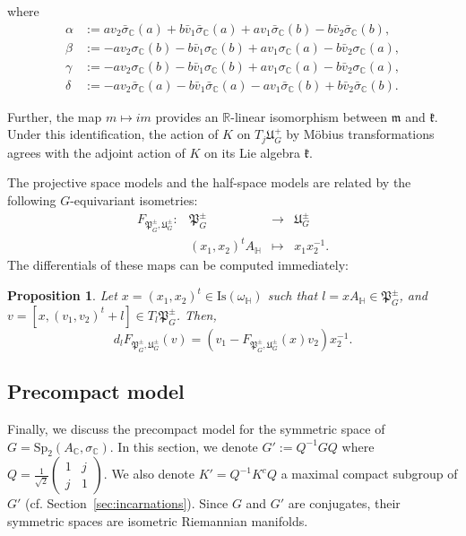 \documentclass[oneside,11pt]{amsart}
\newtheorem{prop}[thm]{Proposition}
\theoremstyle{definition}
\theoremstyle{remark}
\numberwithin{thm}{section}
\numberwithin{equation}{section}
\begin{document}
where
\begin{align*}
\alpha & := av_2\bar\sigma_{\mathbb C}(a)+b\bar v_1\bar\sigma_{\mathbb C}(a)+av_1\bar\sigma_{\mathbb C}(b)-b\bar v_2\bar\sigma_{\mathbb C}(b),\\
\beta & := -av_2\sigma_{\mathbb C}(b)-b\bar v_1\sigma_{\mathbb C}(b)+av_1\sigma_{\mathbb C}(a)-b\bar v_2\sigma_{\mathbb C}(a), \\
\gamma & := -av_2\sigma_{\mathbb C}(b)-b\bar v_1\sigma_{\mathbb C}(b)+av_1\sigma_{\mathbb C}(a)-b\bar v_2\sigma_{\mathbb C}(a),\\
\delta & := -av_2\bar\sigma_{\mathbb C}(a)-b\bar v_1\bar\sigma_{\mathbb C}(a)-av_1\bar\sigma_{\mathbb C}(b)+b\bar v_2\bar\sigma_{\mathbb C}(b).
\end{align*}

Further, the map $m\mapsto im$ provides an $\mathbb R$-linear isomorphism between $\mathfrak{m}$ and $\mathfrak k$. Under this identification, the action of $K$ on $T_j\mathfrak{U}_G^+$ by M\"obius transformations agrees with the adjoint action of $K$ on its Lie algebra $\mathfrak{k}$.

The projective space models and the half-space models are related by the following $G$-equivariant isometries: 
$$\begin{matrix}
F_{\mathfrak{P}_G^\pm,\mathfrak{U}_G^\pm} \colon & \mathfrak{P}_G^\pm & \to & \mathfrak{U}_G^\pm\\
 & (x_1,x_2)^tA_\mathbb H & \mapsto & x_1x_2^{-1}.
\end{matrix}$$
The differentials of these maps can be computed immediately:

\begin{prop}
    Let $x=(x_1,x_2)^t\in\mathrm{Is}(\omega_\mathbb H)$ such that $l=xA_\mathbb H\in\mathfrak{P}_G^\pm$, and $v=[x,(v_1,v_2)^t+l]\in T_{l}\mathfrak{P}_G^\pm$. Then, 
    $$d_{l}F_{\mathfrak{P}_G^\pm,\mathfrak{U}_G^\pm}(v)=(v_1-F_{\mathfrak{P}_G^\pm,\mathfrak{U}_G^\pm}(x) v_2)x_2^{-1}.$$ 
\end{prop}


\subsection{Precompact model}\label{sec:precompact_complex}

Finally, we discuss the precompact model for the symmetric space of $G=\mathrm{Sp}_2(A_\mathbb{C},\sigma_\mathbb{C})$. In this section, we denote
    $G':=Q^{-1}GQ$ where $Q=\frac{1}{\sqrt{2}}\begin{pmatrix}
        1 & j\\
        j & 1
    \end{pmatrix}$.
We also denote $K'=Q^{-1}K^cQ$ a maximal compact subgroup of $G'$ (cf. Section~\ref{sec:incarnations}). Since $G$ and $G'$ are conjugates, their symmetric spaces are isometric Riemannian manifolds.
\end{document}
